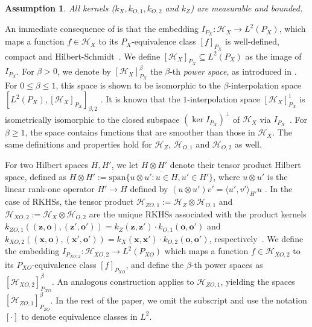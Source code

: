 \documentclass[11pt]{article}
\newcommand{\bx}{\mathbf x}
\newcommand{\bz}{\mathbf z}
\newcommand{\bo}{\mathbf o}
\newcommand{\calH}{\mathcal{H}}
\newcommand{\0}{\mathbf{0}}
\newtheorem{ass}{Assumption}[section]
\begin{document}
\begin{ass}\label{ass: kernel_technical}
All kernels ($k_X, k_{O,1}, k_{O,2}$ and $k_{Z}$) are measurable and bounded.
\end{ass}
An immediate consequence of  is that the embedding $I_{P_{X}} : \calH_{X} \to L^2(P_{X})$, which maps a function $f\in \calH_{X}$ to its $P_{X}$-equivalence class $[f]_{P_{X}}$ is well-defined, compact and Hilbert-Schmidt~\citep[Lemma 2.3]{steinwart2012mercer}. We define $[\calH_X]_{P_X} \subseteq L^2(P_X)$ as the image of $I_{P_{X}}$. For $\beta>0$, we denote by $[\calH_X]_{P_X}^\beta$ the $\beta$-th \emph{power space}, as introduced in \citet[Theorem 4.6]{steinwart2012mercer}. For $0\leq \beta\leq 1$, this space is shown to be isomorphic to the $\beta$-interpolation space $[L^2(P_X),[\calH_X]_{P_X}]_{\beta, 2}$ \citep[Theorem 4.6]{steinwart2012mercer}. 
It is known that the $1$-interpolation space $[\calH_X]_{P_X}^{1}$ is isometrically isomorphic to the closed subspace $(\operatorname{ker} I_{P_{X}})^{\perp}$ of $\calH_X$ via $I_{P_{X}}$~\citep[Lemma 2.12]{steinwart2012mercer}. 
For $\beta \geq 1$, the space contains functions that are smoother than those in $\calH_X$. The same definitions and properties hold for $\calH_{Z}$, $\calH_{O,1}$ and $\calH_{O,2}$ as well.

For two Hilbert spaces $H,H'$, we let $H\otimes H'$ denote their tensor product Hilbert space, defined as 
$H\otimes H' := \overline{\mathrm{span}\{u\otimes u':u\in H,u'\in H'\}}$, 
where $u\otimes u'$ is the linear rank-one operator $H'\rightarrow H$ defined by $(u\otimes u') v' = \langle u', v' \rangle_{H'} u$ \citep[Section 12]{aubin2011applied}. 
In the case of RKHSs, the tensor product $\calH_{ZO,1} := \calH_Z \otimes \calH_{O,1}$ and $\calH_{XO,2} := \mathcal{H}_{X} \otimes \calH_{O,2}$ are the unique RKHSs associated with the product kernels $k_{ZO,1}((\bz,\bo), (\bz',\bo')) = k_{Z}(\bz,\bz') \cdot k_{O,1}(\bo,\bo')$ and $k_{XO,2}((\bx,\bo), (\bx',\bo')) = k_{X}(\bx,\bx') \cdot k_{O,2}(\bo,\bo')$, respectively~\citep{berlinet2004reproducing}. 
We define the embedding $I_{P_{XO,2}} : \calH_{XO,2} \to L^2(P_{XO})$ which maps a function $f\in \calH_{XO,2}$ to its $P_{XO}$-equivalence class $[f]_{P_{XO}}$, and define the $\beta$-th power spaces as $[\calH_{XO,2}]_{P_{XO}}^\beta$.
An analogous construction applies to $\mathcal{H}_{Z O, 1}$, yielding the spaces $[\calH_{Z O, 1}]_{P_{Z O}}^\beta$. 
In the rest of the paper, we omit the subscript and use the notation $[\cdot]$ to denote equivalence classes in $L^2$. 
\end{document}
